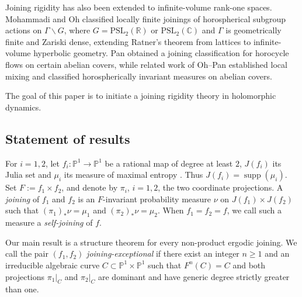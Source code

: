 \documentclass[11pt]{amsart}
\numberwithin{equation}{section}
\theoremstyle{plain}
\theoremstyle{definition}
\theoremstyle{remark}
\begin{document}
Joining rigidity has also been extended to infinite-volume rank-one spaces.
Mohammadi and Oh \cite{MohammadiOh2016} classified locally finite joinings of
horospherical subgroup actions on $\Gamma\backslash G$, where
$G=\mathrm{PSL}_2(\mathbb R)$ or
$\mathrm{PSL}_2(\mathbb C)$ and $\Gamma$ is geometrically finite and
Zariski dense, extending Ratner's theorem from lattices to infinite-volume
hyperbolic geometry. Pan \cite{Pan2018} obtained a joining classification for
horocycle flows on certain abelian covers, while related work of Oh--Pan
\cite{OhPan2019} established local mixing and classified horospherically
invariant measures on abelian covers.

The goal of this paper is to initiate a joining rigidity theory in
holomorphic dynamics.


\subsection{Statement of results}
For $i=1,2$, let
$f_i\colon \mathbb P^1\to\mathbb P^1$ be 
a rational map of
degree at least $2$,  $J(f_i)$ its Julia
set and  $\mu_i$ 
its measure of maximal entropy
\cite{Lyubich83,FLM83}. Thus $J(f_i)=\operatorname{supp}(\mu_i)$.
Set $F:=f_1\times f_2$, and denote by $\pi_i$,
$i=1,2$, the two coordinate projections.
A \emph{joining} of $f_1$ and $f_2$ is an $F$-invariant probability
measure $\nu$ on $J(f_1)\times J(f_2)$ such that
$(\pi_1)_*\nu=\mu_1$ and $(\pi_2)_*\nu=\mu_2$.
When $f_1=f_2=f$, we call such a measure a \emph{self-joining} of $f$.

Our main result is a structure theorem for every non-product ergodic
joining. We call the pair $(f_1,f_2)$ \emph{joining-exceptional} if there
exist an integer $n\geq1$ and an irreducible algebraic curve
$C\subset\mathbb P^1\times\mathbb P^1$ such that
$F^n(C)=C$ and both projections
$\pi_1|_C$ and $\pi_2|_C$ are dominant and have generic degree
strictly greater than one.
\end{document}
